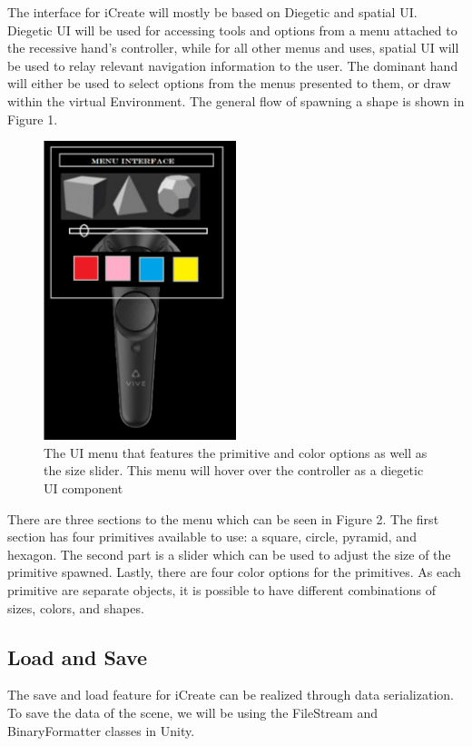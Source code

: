 \documentclass[draftclsnofoot,onecolumn,compsoc]{IEEEtran}
\begin{document}
The interface for iCreate will mostly be based on
Diegetic and spatial UI. Diegetic UI will be used for accessing tools and
options from a menu attached to the recessive hand’s controller, while for all other menus and uses, spatial UI will be used to relay relevant navigation
information to the user. The dominant hand will either be used to select
options from the menus presented to them, or draw within the virtual
Environment.  The general flow of spawning a shape is shown in Figure 1.
\\
\begin{figure}[H]
  \centering
    \includegraphics[width=0.5\textwidth]{menu}
    \caption{The UI menu that features the primitive and color options as well as the size slider. This menu will hover over the controller as a diegetic UI component}
\end{figure}

There are three sections to the menu which can be seen  in Figure 2. The first section has four primitives available to use: a square, circle, pyramid, and hexagon. The second part is a slider which can be used to adjust the size of the primitive spawned. Lastly, there are four color options for the primitives. As each primitive are separate objects, it is possible to have different combinations of sizes, colors, and shapes. 

\newpage

\subsection{Load and Save}
The save and load feature for iCreate can be realized through data serialization. To save the data of the scene, we will be using the FileStream and BinaryFormatter classes in Unity.
\end{document}
